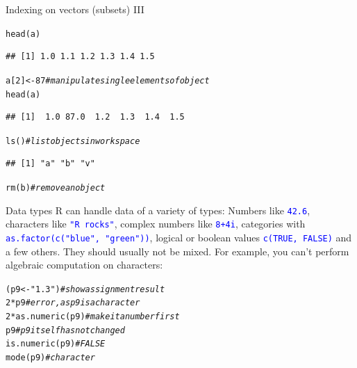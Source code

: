 \documentclass[xcolor=table,       handout,    xcolor=dvipsnames]{beamer}\usepackage[]{graphicx}\usepackage[]{color}
\makeatletter
\newcommand{\hlnum}[1]{\textcolor[rgb]{0,0,0}{#1}}
\newcommand{\hlstr}[1]{\textcolor[rgb]{0.545,0.137,0.137}{#1}}
\newcommand{\hlcom}[1]{\textcolor[rgb]{0,0.392,0}{\textit{#1}}}
\newcommand{\hlopt}[1]{\textcolor[rgb]{0,0,0}{#1}}
\newcommand{\hlstd}[1]{\textcolor[rgb]{0,0,0}{#1}}
\newcommand{\hlkwb}[1]{\textcolor[rgb]{0,0,0}{#1}}
\newcommand{\hlkwd}[1]{\textcolor[rgb]{0,0,1}{#1}}
\newenvironment{kframe}{%
 \def\at@end@of@kframe{}%
 \ifinner\ifhmode%
  \def\at@end@of@kframe{\end{minipage}}%
  \begin{minipage}{\columnwidth}%
 \fi\fi%
 \def\FrameCommand##1{\hskip\@totalleftmargin \hskip-\fboxsep
 \colorbox{shadecolor}{##1}\hskip-\fboxsep
     \hskip-\linewidth \hskip-\@totalleftmargin \hskip\columnwidth}%
 \MakeFramed {\advance\hsize-\width
   \@totalleftmargin\z@ \linewidth\hsize
   \@setminipage}}%
 {\par\unskip\endMakeFramed%
 \at@end@of@kframe}
\newenvironment{knitrout}{}{} %
\newcommand{\rcode}[1]{\texttt{\textcolor{Blue}{#1}}} %
\makeatother
\begin{document}
\begin{frame}[fragile]{Indexing on vectors (subsets) III}
\begin{knitrout}
\color{fgcolor}\begin{kframe}
\begin{alltt}
\hlkwd{head}\hlstd{(a)}
\end{alltt}
\begin{verbatim}
## [1] 1.0 1.1 1.2 1.3 1.4 1.5
\end{verbatim}
\begin{alltt}
\hlstd{a[}\hlnum{2}\hlstd{]} \hlkwb{<-} \hlnum{87} \hlcom{# manipulate single elements of object}
\hlkwd{head}\hlstd{(a)}
\end{alltt}
\begin{verbatim}
## [1]  1.0 87.0  1.2  1.3  1.4  1.5
\end{verbatim}
\end{kframe}
\end{knitrout}
\onslide<+->
\begin{knitrout}
\color{fgcolor}\begin{kframe}
\begin{alltt}
\hlkwd{ls}\hlstd{()} \hlcom{# list objects in workspace}
\end{alltt}
\begin{verbatim}
## [1] "a" "b" "v"
\end{verbatim}
\begin{alltt}
\hlkwd{rm}\hlstd{(b)} \hlcom{# remove an object}
\end{alltt}
\end{kframe}
\end{knitrout}
\end{frame}


\begin{frame}[fragile]{Data types}
R can handle data of a variety of types: Numbers like \rcode{42.6}, characters like \rcode{"R rocks"}, complex numbers like \rcode{8+4i}, categories with \rcode{as.factor(c("blue", "green"))}, logical or boolean values \rcode{c(TRUE, FALSE)} and a few others. They should usually not be mixed. For example, you can't perform algebraic computation on characters:
\begin{knitrout}
\color{fgcolor}\begin{kframe}
\begin{alltt}
\hlstd{(p9} \hlkwb{<-} \hlstr{"1.3"}\hlstd{)}    \hlcom{# show assignment result}
\hlnum{2}\hlopt{*}\hlstd{p9}             \hlcom{# error, as p9 is a character}
\hlnum{2}\hlopt{*}\hlkwd{as.numeric}\hlstd{(p9)} \hlcom{# make it a number first}
\hlstd{p9}               \hlcom{# p9 itself has not changed}
\hlkwd{is.numeric}\hlstd{(p9)}   \hlcom{# FALSE}
\hlkwd{mode}\hlstd{(p9)}         \hlcom{# character}
\end{alltt}
\end{kframe}
\end{knitrout}
\end{frame}
\end{document}
